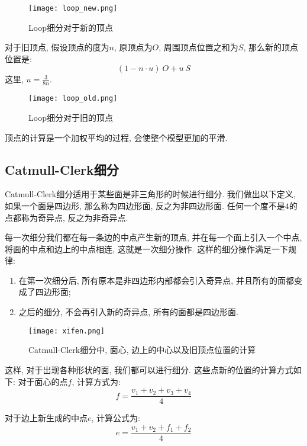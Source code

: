 \begin{figure}[H]
	\centering
	\texttt{[image: loop\_new.png]}
	\caption{Loop细分对于新的顶点}
	\label{fig:loop_new}
\end{figure}

对于旧顶点, 假设顶点的度为$n$, 原顶点为$O$, 周围顶点位置之和为$S$, 那么新的顶点位置是: 
\begin{equation}
	(1-n\cdot u)\ O+u\ S
\end{equation}
这里, $u=\frac{3}{8n}$. 

\begin{figure}[H]
	\centering
	\texttt{[image: loop\_old.png]}
	\caption{Loop细分对于旧的顶点}
	\label{fig:loop_old}
\end{figure}

顶点的计算是一个加权平均的过程, 会使整个模型更加的平滑. 

\subsection{Catmull-Clerk细分}
Catmull-Clerk细分适用于某些面是非三角形的时候进行细分. 我们做出以下定义, 如果一个面是四边形, 那么称为四边形面, 反之为非四边形面. 任何一个度不是$4$的点都称为奇异点, 反之为非奇异点. 

每一次细分我们都在每一条边的中点产生新的顶点, 并在每一个面上引入一个中点, 将面的中点和边上的中点相连, 这就是一次细分操作. 这样的细分操作满足一下规律: 
\begin{enumerate}
	\item 在第一次细分后, 所有原本是非四边形内部都会引入奇异点, 并且所有的面都变成了四边形面; 
	\item 之后的细分, 不会再引入新的奇异点, 所有的面都是四边形面. 
\end{enumerate}

\begin{figure}[H]
	\centering
	\texttt{[image: xifen.png]}
	\caption{Catmull-Clerk细分中, 面心, 边上的中心以及旧顶点位置的计算}
	\label{fig:xifen}
\end{figure}
这样, 对于出现各种形状的面, 我们都可以进行细分. 这些点新的位置的计算方式如下: 
对于面心的点$f$, 计算方式为: 
\begin{equation}
	f=\frac{v_1+v_2+v_3+v_4}{4}
\end{equation}

对于边上新生成的中点$e$, 计算公式为:
\begin{equation}
	e=\frac{v_1+v_2+f_1+f_2}{4}
\end{equation}

